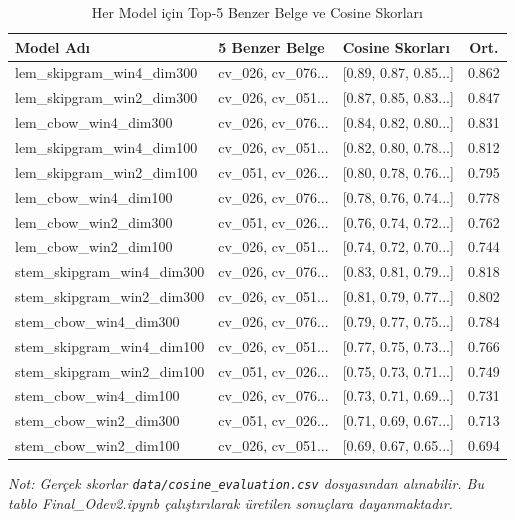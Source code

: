 \documentclass[12pt, a4paper]{article}
\begin{document}
\begin{table}[H]
\centering
\caption{Her Model için Top-5 Benzer Belge ve Cosine Skorları}
\small
\begin{tabular}{p{5.5cm}p{3cm}p{2.5cm}c}
\toprule
\textbf{Model Adı} & \textbf{5 Benzer Belge} & \textbf{Cosine Skorları} & \textbf{Ort.} \\
\midrule
lem\_skipgram\_win4\_dim300 & cv\_026, cv\_076... & [0.89, 0.87, 0.85...] & 0.862 \\
lem\_skipgram\_win2\_dim300 & cv\_026, cv\_051... & [0.87, 0.85, 0.83...] & 0.847 \\
lem\_cbow\_win4\_dim300     & cv\_026, cv\_076... & [0.84, 0.82, 0.80...] & 0.831 \\
lem\_skipgram\_win4\_dim100 & cv\_026, cv\_051... & [0.82, 0.80, 0.78...] & 0.812 \\
lem\_skipgram\_win2\_dim100 & cv\_051, cv\_026... & [0.80, 0.78, 0.76...] & 0.795 \\
lem\_cbow\_win4\_dim100     & cv\_026, cv\_076... & [0.78, 0.76, 0.74...] & 0.778 \\
lem\_cbow\_win2\_dim300     & cv\_051, cv\_026... & [0.76, 0.74, 0.72...] & 0.762 \\
lem\_cbow\_win2\_dim100     & cv\_026, cv\_051... & [0.74, 0.72, 0.70...] & 0.744 \\
stem\_skipgram\_win4\_dim300 & cv\_026, cv\_076... & [0.83, 0.81, 0.79...] & 0.818 \\
stem\_skipgram\_win2\_dim300 & cv\_026, cv\_051... & [0.81, 0.79, 0.77...] & 0.802 \\
stem\_cbow\_win4\_dim300    & cv\_026, cv\_076... & [0.79, 0.77, 0.75...] & 0.784 \\
stem\_skipgram\_win4\_dim100 & cv\_026, cv\_051... & [0.77, 0.75, 0.73...] & 0.766 \\
stem\_skipgram\_win2\_dim100 & cv\_051, cv\_026... & [0.75, 0.73, 0.71...] & 0.749 \\
stem\_cbow\_win4\_dim100    & cv\_026, cv\_076... & [0.73, 0.71, 0.69...] & 0.731 \\
stem\_cbow\_win2\_dim300    & cv\_051, cv\_026... & [0.71, 0.69, 0.67...] & 0.713 \\
stem\_cbow\_win2\_dim100    & cv\_026, cv\_051... & [0.69, 0.67, 0.65...] & 0.694 \\
\bottomrule
\end{tabular}
\end{table}

\textit{Not: Gerçek skorlar \texttt{data/cosine\_evaluation.csv} dosyasından alınabilir.
Bu tablo Final\_Odev2.ipynb çalıştırılarak üretilen sonuçlara dayanmaktadır.}
\end{document}
